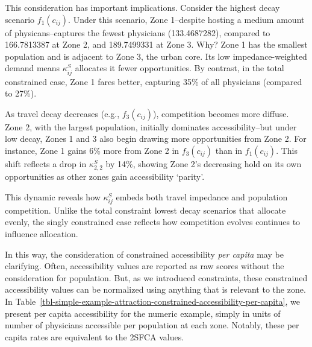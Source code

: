 \documentclass[
  10pt,
  letterpaper,
]{article}
\begin{document}
This consideration has important implications. Consider the highest
decay scenario \(f_1(c_{ij})\). Under this scenario, Zone 1--despite
hosting a medium amount of physicans--captures the fewest physicians
(133.4687282), compared to 166.7813387 at Zone 2, and 189.7499331 at
Zone 3. Why? Zone 1 has the smallest population and is adjacent to Zone
3, the urban core. Its low impedance-weighted demand means
\(\kappa^S_{ij}\) allocates it fewer opportunities. By contrast, in the
total constrained case, Zone 1 fares better, capturing 35\% of all
physicians (compared to 27\%).

As travel decay decreases (e.g., \(f_3(c_{ij})\)), competition becomes
more diffuse. Zone 2, with the largest population, initially dominates
accessibility--but under low decay, Zones 1 and 3 also begin drawing
more opportunities from Zone 2. For instance, Zone 1 gains 6\% more from
Zone 2 in \(f_3(c_{ij})\) than in \(f_1(c_{ij})\). This shift reflects a
drop in \(\kappa^S_{2,2}\) by 14\%, showing Zone 2's decreasing hold on
its own opportunities as other zones gain accessibility `parity'.

This dynamic reveals how \(\kappa^S_{ij}\) embeds both travel impedance
and population competition. Unlike the total constraint lowest decay
scenarios that allocate evenly, the singly constrained case reflects how
competition evolves continues to influence allocation.

In this way, the consideration of constrained accessibility \emph{per
capita} may be clarifying. Often, accessibility values are reported as
raw scores without the consideration for population. But, as we
introduced constraints, these constrained accessibility values can be
normalized using anything that is relevant to the zone. In
Table~\ref{tbl-simple-example-attraction-constrained-accessibility-per-capita},
we present per capita accessibility for the numeric example, simply in
units of number of physicians accessible per population at each zone.
Notably, these per capita rates are equivalent to the 2SFCA values.
\end{document}
